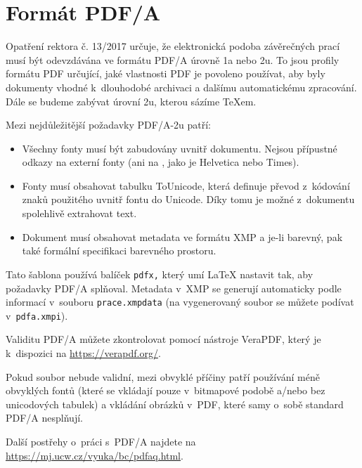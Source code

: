 
\chapter{Formát PDF/A}

Opatření rektora č. 13/2017 určuje, že elektronická podoba závěrečných prací musí být odevzdávána ve formátu PDF/A úrovně 1a nebo 2u.
To jsou profily formátu PDF určující, jaké vlastnosti PDF je povoleno používat, aby byly dokumenty vhodné k~dlouhodobé archivaci a dalšímu automatickému zpracování.
Dále se budeme zabývat úrovní 2u, kterou sázíme \TeX{}em.

Mezi nejdůležitější požadavky PDF/A-2u patří:

\begin{itemize}

\item Všechny fonty musí být zabudovány uvnitř dokumentu.
Nejsou přípustné odkazy na externí fonty (ani na , jako je Helvetica nebo Times).

\item Fonty musí obsahovat tabulku ToUnicode, která definuje převod z~kódování znaků použitého uvnitř fontu do Unicode.
Díky tomu je možné z~dokumentu spolehlivě extrahovat text.

\item Dokument musí obsahovat metadata ve formátu XMP a je-li barevný, pak také formální specifikaci barevného prostoru.

\end{itemize}

Tato šablona používá balíček {\tt pdfx,} který umí \LaTeX{} nastavit tak, aby požadavky PDF/A splňoval.
Metadata v~XMP se generují automaticky podle informací v~souboru {\tt prace.xmpdata} (na vygenerovaný soubor se můžete podívat v~{\tt pdfa.xmpi}).

Validitu PDF/A můžete zkontrolovat pomocí nástroje VeraPDF, který je k~dispozici na \url{https://verapdf.org/}.

Pokud soubor nebude validní, mezi obvyklé příčiny patří používání méně obvyklých fontů (které se vkládají pouze v~bitmapové podobě a/nebo bez unicodových tabulek) a vkládání obrázků v~PDF, které samy o~sobě standard PDF/A nesplňují.

Další postřehy o~práci s~PDF/A najdete na \url{https://mj.ucw.cz/vyuka/bc/pdfaq.html}.
